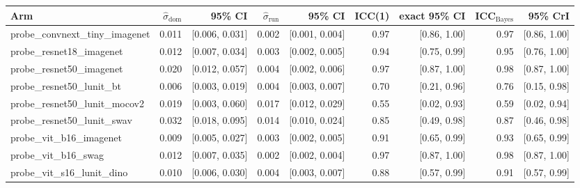 \begin{tabular}{lrrrrrrrr}
\toprule
Arm & $\hat\sigma_\text{dom}$ & 95\% CI & $\hat\sigma_\text{run}$ & 95\% CI & ICC(1) & exact 95\% CI & ICC$_\text{Bayes}$ & 95\% CrI \\
\midrule
probe\_convnext\_tiny\_imagenet & 0.011 & [0.006, 0.031] & 0.002 & [0.001, 0.004] & 0.97 & [0.86, 1.00] & 0.97 & [0.86, 1.00] \\
probe\_resnet18\_imagenet & 0.012 & [0.007, 0.034] & 0.003 & [0.002, 0.005] & 0.94 & [0.75, 0.99] & 0.95 & [0.76, 1.00] \\
probe\_resnet50\_imagenet & 0.020 & [0.012, 0.057] & 0.004 & [0.002, 0.006] & 0.97 & [0.87, 1.00] & 0.98 & [0.87, 1.00] \\
probe\_resnet50\_lunit\_bt & 0.006 & [0.003, 0.019] & 0.004 & [0.003, 0.007] & 0.70 & [0.21, 0.96] & 0.76 & [0.15, 0.98] \\
probe\_resnet50\_lunit\_mocov2 & 0.019 & [0.003, 0.060] & 0.017 & [0.012, 0.029] & 0.55 & [0.02, 0.93] & 0.59 & [0.02, 0.94] \\
probe\_resnet50\_lunit\_swav & 0.032 & [0.018, 0.095] & 0.014 & [0.010, 0.024] & 0.85 & [0.49, 0.98] & 0.87 & [0.46, 0.98] \\
probe\_vit\_b16\_imagenet & 0.009 & [0.005, 0.027] & 0.003 & [0.002, 0.005] & 0.91 & [0.65, 0.99] & 0.93 & [0.65, 0.99] \\
probe\_vit\_b16\_swag & 0.012 & [0.007, 0.035] & 0.002 & [0.002, 0.004] & 0.97 & [0.87, 1.00] & 0.98 & [0.87, 1.00] \\
probe\_vit\_s16\_lunit\_dino & 0.010 & [0.006, 0.030] & 0.004 & [0.003, 0.007] & 0.88 & [0.57, 0.99] & 0.91 & [0.57, 0.99] \\
\bottomrule
\end{tabular}
